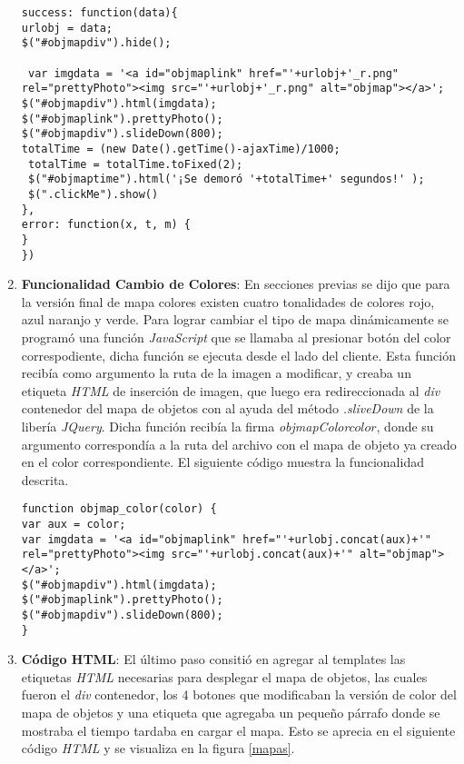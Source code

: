 \begin{enumerate}[label=\alph*) ,font=\bfseries]
\begin{lstlisting}[style=Java, caption={Función de despligue del Mapa de Objetos.}]
success: function(data){
urlobj = data;
$("#objmapdiv").hide();
  
 var imgdata = '<a id="objmaplink" href="'+urlobj+'_r.png" rel="prettyPhoto"><img src="'+urlobj+'_r.png" alt="objmap"></a>';
$("#objmapdiv").html(imgdata);
$("#objmaplink").prettyPhoto();
$("#objmapdiv").slideDown(800);
totalTime = (new Date().getTime()-ajaxTime)/1000;
 totalTime = totalTime.toFixed(2);
 $("#objmaptime").html('¡Se demoró '+totalTime+' segundos!' );
 $(".clickMe").show()
},
error: function(x, t, m) {
}
})
\end{lstlisting}
\item \textbf{Funcionalidad Cambio de Colores}: En secciones previas se dijo que para la versión 
final de mapa colores existen cuatro tonalidades de colores rojo, azul naranjo y verde. Para lograr
cambiar el tipo de mapa dinámicamente se programó una función \textit{JavaScript} que se llamaba al presionar botón del color correspodiente, dicha función se ejecuta desde el lado del cliente. Esta función recibía como argumento la ruta de la imagen
a modificar, y creaba un etiqueta \textit{HTML} de inserción de imagen, que luego era redireccionada
al \textit{div} contenedor del mapa de objetos con al ayuda del método \textit{.sliveDown\(\)} de la
libería \textit{JQuery}. Dicha función recibía la firma \textit{objmapColor\(color\)}, donde su 
argumento correspondía a la ruta del archivo con el mapa de objeto ya creado en el color 
correspondiente. El siguiente código muestra la funcionalidad descrita.
\newpage
\begin{lstlisting}[style=Java, caption={Función que genera el cambio de colores en el Mapa de Objetos.}]
function objmap_color(color) {
var aux = color;      
var imgdata = '<a id="objmaplink" href="'+urlobj.concat(aux)+'" rel="prettyPhoto"><img src="'+urlobj.concat(aux)+'" alt="objmap"></a>';
$("#objmapdiv").html(imgdata);
$("#objmaplink").prettyPhoto();
$("#objmapdiv").slideDown(800);
}
\end{lstlisting}
\item \textbf{Código HTML}: El último paso consitió en agregar al templates las etiquetas 
\textit{HTML} necesarias para desplegar el mapa de objetos, las cuales fueron el \textit{div}
contenedor, los 4 botones que modificaban la versión de color del mapa de objetos y una 
etiqueta que agregaba un pequeño párrafo donde se mostraba el tiempo tardaba en cargar el mapa.
Esto se aprecia en el siguiente código \textit{HTML} y se visualiza en la figura \ref{mapas}.
\begin{lstlisting}[style=Java, caption={Contenido \textit{HTML} donde se aloja el Mapa de Objetos.}]

\end{lstlisting}
\end{enumerate}
